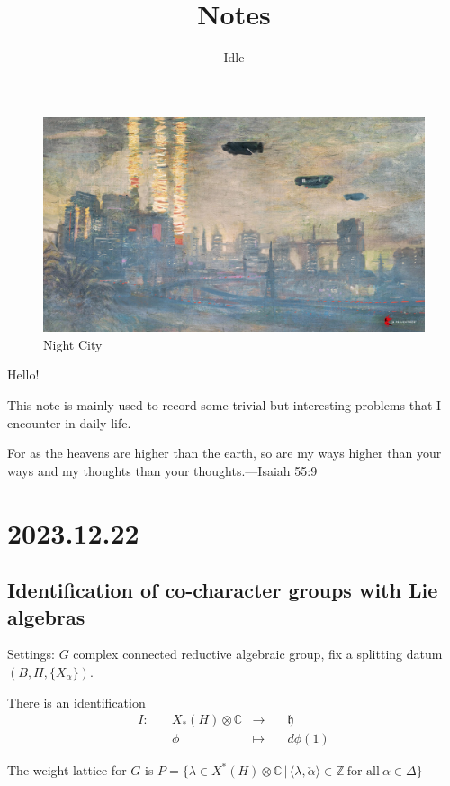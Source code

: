 \documentclass[12pt]{amsart}
\author{Idle}
\numberwithin{equation}{section}
\newcommand{\BC}{{\mathbb {C}}}
\newcommand{\BZ}{{\mathbb {Z}}}
\newcommand{\fh}{\mathfrak{h}}
\newcommand{\set}[2]{\{#1\,|\,#2\}}
\newcommand{\defmap}[5]{
           \begin{equation*}
              \begin{aligned}
                   #1:\quad  & #2 &\longrightarrow &\quad #3 \\
                      \quad  & #4    &\longmapsto  &\quad #5
              \end{aligned}
           \end{equation*}
          }
\begin{document}
\title[Notes]{Notes}
\maketitle
\begin{figure}
  \centering
  \includegraphics[width=1.0\linewidth]{Claude_Monet-NC.jpg}
  \caption{Night City}
  \label{night City}
\end{figure}

Hello!


This note is mainly used to record some trivial
but interesting problems that I encounter
in daily life.



For as the heavens are higher than the earth, so are my ways higher than your ways and my thoughts than your thoughts.---Isaiah 55:9

\newpage


\tableofcontents

\newpage

\section{2023.12.22}\label{1}

\subsection{Identification of co-character groups with Lie algebras}
Settings: $G$ complex connected reductive algebraic group, fix a splitting datum
$(B,H,\{X_\alpha\})$.


There is an identification \defmap{I}{X_*(H)\otimes \BC}{\fh}{\phi}{d\phi(1)}


The weight lattice for $G$ is $P = \set{\lambda \in X^*(H)\otimes \BC}{\langle \lambda, \check{\alpha} \rangle \in \BZ \ \textrm{for all} \ \alpha \in \Delta }$
\end{document}
